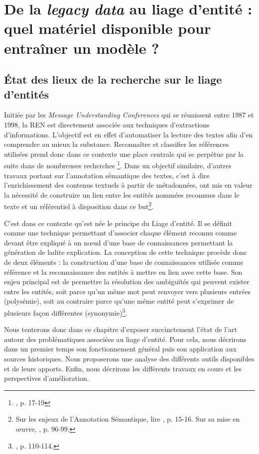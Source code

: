 \documentclass[a4paper,12pt,twoside]{book}
\begin{document}
	\part{De la \textit{legacy data} au liage d'entité : quel matériel disponible pour entraîner un modèle ?}
	
	\chapter{État des lieux de la recherche sur le liage d'entités}
	
	Initiée par les \textit{Message Understanding Conferences} qui se réunissent entre 1987 et 1998, la REN est directement associée aux techniques d'extractions d'informations. L'objectif est en effet d'automatiser la lecture des textes afin d'en comprendre au mieux la substance. Reconnaître et classifier les références utilisées prend donc dans ce contexte une place centrale qui se perpétue par la suite dans de nombreuses recherches \footnote{\cite{ehrmann_les_2008}, p. 17-19}. Dans un objectif similaire, d'autres travaux portant sur l'annotation sémantique des textes, c'est à dire l'enrichissement des contenus textuels à partir de métadonnées, ont mis en valeur la nécessité de construire un lien entre les entités nommées reconnues dans le texte et un référentiel à disposition dans ce but\footnote{Sur les enjeux de l'Annotation Sémantique, lire \cite{stern_identification_2013}, p. 15-16. Sur sa mise en œuvre, \cite{stern_identification_2013}, p. 96-99.}.
	
	C'est dans ce contexte qu'est née le principe du Liage d'entité. Il se définit comme une technique permettant d'associer chaque élément reconnu comme devant être expliqué à un nœud d'une base de connaissances permettant la génération de ladite explication. La conception de cette technique procède donc de deux éléments : la construction d'une base de connaissances utilisée comme référence et la reconnaissance des entités à mettre en lien avec cette base. Son enjeu principal est de permettre la résolution des ambiguïtés qui peuvent exister entre les entités, soit parce qu'un même mot peut renvoyer vers plusieurs entrées (polysémie), soit au contraire parce qu'une même entité peut s'exprimer de plusieurs façon différentes (synonymie)\footnote{\cite{stern_identification_2013}, p. 110-114.}.
	
	Nous tenterons donc dans ce chapitre d'exposer succinctement l'état de l'art autour des  problématiques associées au liage d'entité. Pour cela, nous décrirons dans un premier temps son fonctionnement général puis son application aux sources historiques. Nous proposerons une analyse des différents outils disponibles et de leurs apports. Enfin, nous décrirons les différents travaux en cours et les perspectives d'amélioration.
	
\end{document}
